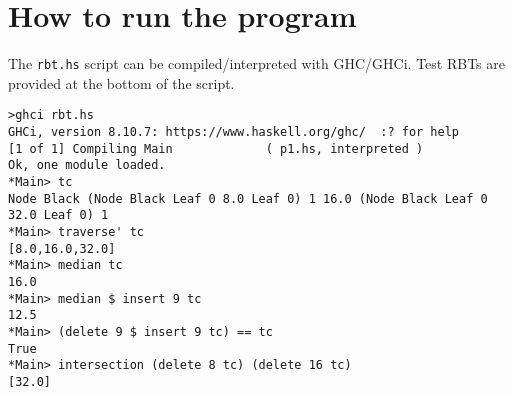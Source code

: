 \documentclass{article}
\begin{document}
\section{How to run the program}

The \verb+rbt.hs+ script can be compiled/interpreted with GHC/GHCi.
Test RBTs are provided at the bottom of the script.
\begin{verbatim}
>ghci rbt.hs
GHCi, version 8.10.7: https://www.haskell.org/ghc/  :? for help
[1 of 1] Compiling Main             ( p1.hs, interpreted )
Ok, one module loaded.
*Main> tc
Node Black (Node Black Leaf 0 8.0 Leaf 0) 1 16.0 (Node Black Leaf 0 32.0 Leaf 0) 1
*Main> traverse' tc
[8.0,16.0,32.0]
*Main> median tc
16.0
*Main> median $ insert 9 tc
12.5
*Main> (delete 9 $ insert 9 tc) == tc
True
*Main> intersection (delete 8 tc) (delete 16 tc)
[32.0]
\end{verbatim}
\end{document}
